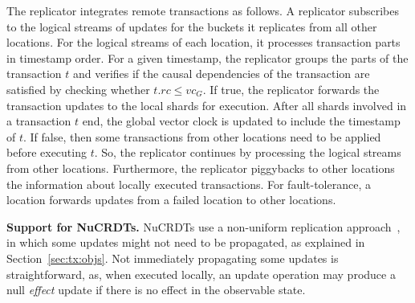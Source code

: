 \documentclass[sigplan,twocolumn,review,anonymous]{acmart}
\begin{document}
The replicator integrates remote transactions as follows.
A replicator subscribes to the logical streams of updates for the buckets it replicates from all other 
locations. For the logical streams of each location, it processes transaction parts in timestamp order.
For a given timestamp, the replicator groups the parts of the transaction $t$ and verifies if the causal dependencies 
of the transaction are satisfied by checking whether $t.rc \leq \mathit{vc}_G$.
If true, the replicator 
forwards the
transaction updates to the local shards for execution. 
After all shards involved in a transaction $t$ end, 
the global
vector clock is updated to include the timestamp of $t$. If false, then some transactions
from other locations need to be applied before executing $t$. So, the replicator continues by processing
the logical streams from other locations.
Furthermore, the replicator piggybacks to other locations the information about locally executed transactions.
For fault-tolerance, a location forwards updates from a failed
location to other locations.

\textbf{Support for NuCRDTs.}
\label{subsec:nonuniform}
NuCRDTs use a non-uniform replication approach~\cite{Cabrita17Nonuniform}, in which some 
updates might not need to be propagated, as explained in Section~\ref{sec:tx:objs}.
Not immediately propagating some updates is straightforward, as, when executed locally, 
an update operation may produce a null \emph{effect} update if there is no
effect in the observable state.

\end{document}
